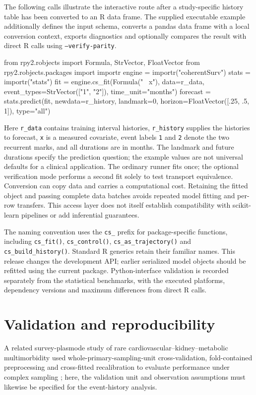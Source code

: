 \documentclass[article,nojss]{jss}
\newcommand{\proglang}[1]{\textsf{#1}}
\newcommand{\code}[1]{\texttt{#1}}
\begin{document}
The following calls illustrate the interactive route after a study-specific history table has been converted to an \proglang{R} data frame. The supplied executable example additionally defines the input schema, converts a pandas data frame with a local conversion context, exports diagnostics and optionally compares the result with direct \proglang{R} calls using \code{--verify-parity}.
\begin{Code}
from rpy2.robjects import Formula, StrVector, FloatVector
from rpy2.robjects.packages import importr
engine = importr("coherentSurv")
stats = importr("stats")
fit = engine.cs_fit(Formula("~ x"), data=r_data,
                    event_types=StrVector(["1", "2"]),
                    time_unit="months")
forecast = stats.predict(fit, newdata=r_history, landmark=0,
                         horizon=FloatVector([.25, .5, 1]),
                         type="all")
\end{Code}
Here \code{r\_data} contains training interval histories, \code{r\_history} supplies the histories to forecast, \code{x} is a measured covariate, event labels \code{1} and \code{2} denote the two recurrent marks, and all durations are in months. The landmark and future durations specify the prediction question; the example values are not universal defaults for a clinical application. The ordinary runner fits once; the optional verification mode performs a second fit solely to test transport equivalence. Conversion can copy data and carries a computational cost. Retaining the fitted object and passing complete data batches avoids repeated model fitting and per-row transfers. This access layer does not itself establish compatibility with scikit-learn pipelines or add inferential guarantees.

The naming convention uses the \code{cs\_} prefix for package-specific functions, including \code{cs\_fit()}, \code{cs\_control()}, \code{cs\_as\_trajectory()} and \code{cs\_build\_history()}. Standard \proglang{R} generics retain their familiar names. This release changes the development API; earlier serialized model objects should be refitted using the current package. Python-interface validation is recorded separately from the statistical benchmarks, with the executed platforms, dependency versions and maximum differences from direct \proglang{R} calls.

\section{Validation and reproducibility}\label{sec:reproducibility}
A related survey-plasmode study of rare cardiovascular--kidney--metabolic multimorbidity used whole-primary-sampling-unit cross-validation, fold-contained preprocessing and cross-fitted recalibration to evaluate performance under complex sampling \citep{AdetunjiSurvey2026}; here, the validation unit and observation assumptions must likewise be specified for the event-history analysis.
\end{document}
